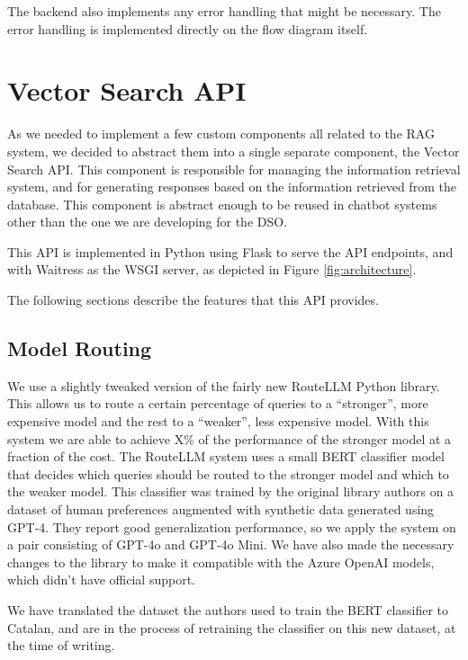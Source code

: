 \documentclass[a4paper,12pt,twoside]{ThesisStyle}
\begin{document}
The backend also implements any error handling that might be necessary. The error handling is implemented directly on the flow diagram itself.

\section{Vector Search API}
\label{sec:vector_search_api}

As we needed to implement a few custom components all related to the RAG system, we decided to abstract them into a single separate component, the Vector Search API. This component is responsible for managing the information retrieval system, and for generating responses based on the information retrieved from the database. This component is abstract enough to be reused in chatbot systems other than the one we are developing for the DSO.

This API is implemented in Python using Flask to serve the API endpoints, and with Waitress as the WSGI server, as depicted in Figure \ref{fig:architecture}.

The following sections describe the features that this API provides.

\subsection{Model Routing}
\label{subsec:model_routing}

We use a slightly tweaked version of the fairly new RouteLLM Python library. This allows us to route a certain percentage of queries to a ``stronger'', more expensive model and the rest to a ``weaker'', less expensive model. With this system we are able to achieve X\% of the performance of the stronger model at a fraction of the cost. The RouteLLM system uses a small BERT classifier model that decides which queries should be routed to the stronger model and which to the weaker model. This classifier was trained by the original library authors on a dataset of human preferences augmented with synthetic data generated using GPT-4. They report good generalization performance, so we apply the system on a pair consisting of GPT-4o and GPT-4o Mini. We have also made the necessary changes to the library to make it compatible with the Azure OpenAI models, which didn't have official support.

We have translated the dataset the authors used to train the BERT classifier to Catalan, and are in the process of retraining the classifier on this new dataset, at the time of writing.
\end{document}
